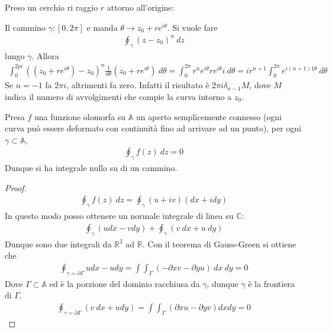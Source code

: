\documentclass[a4paper, oneside]{article}
\begin{document}
\begin{example}
    Preso un cerchio ri raggio $r$ attorno all'origine:

    Il cammino $\gamma : [0, 2\pi]$ e manda $\theta \to z_0 + re^{i\theta}$. Si vuole fare
    \begin{gather*}
        \oint_{\gamma} (z - z_0)^{n} \ dz 
    \end{gather*}
    lungo $\gamma$. Allora 
    \begin{gather*}
        \int_{0}^{2pi} ((z_0 + re^{i\theta}) - z_0)^{n} \frac{1}{d\theta}(z_0 + re^{i\theta})\ d\theta = \int_{0}^{2\pi} r^{n} e^{i\theta} re^{i\theta}i\ d\theta = ir^{n + 1}\int_{0}^{2\pi} e^{i(n + 1)1\theta} \ d\theta    
    \end{gather*}
    Se $n = -1$ fa $2\pi i$, altrimenti fa zero. Infatti il risultato è $2\pi i \delta_{n - 1}M$, dove $M$ indica il numero di 
    avvolgimenti che compie la curva intorno a $z_0$. 
\end{example}


\begin{theorem}
    Presa $f$ una funzione olomorfa su $\mathbb{A}$ un aperto semplicemente
    connesso (ogni curva può essere deformato con continuità fino ad arrivare ad un punto), 
    per ogni $\gamma \subset \mathbb{A}$, 
    \begin{align}
        \oint_{\gamma} f(z) \ dz = 0 
    \end{align}
    Dunque si ha integrale nullo su di un cammino. 
\end{theorem}
\begin{proof}
    \begin{gather*}
        \oint _{\gamma} f(z ) \ dz = \oint _\gamma (u + iv)(dx + i dy)
    \end{gather*}
    In questo modo posso ottenere un normale integrale di linea su $\mathbb{C}$:
    \begin{gather*}
        \oint_{\gamma}^{} (u dx - v dy)  + \oint_\gamma  (v\ dx + u\ dy)
    \end{gather*}
    Dunque sono due integrali da $\mathbb{R}^{2}$ ad $\mathbb{R}$. Con il teorema di Gauss-Green
    si ottiene che 
    \begin{gather*}
        \oint_{\gamma = \partial \Gamma} u dx - u dy = \int\int_{\Gamma} (-\partial x v - \partial y u) \ dx \ dy  = 0
    \end{gather*}
    Dove $\Gamma \subset \mathbb{A}$ ed è la porzione del dominio racchiusa da $\gamma$, dunque
    $\gamma$ è la frontiera di $\Gamma$. 
    \begin{gather*}
        \oint _{\gamma = \partial \Gamma} (v \ dx + u dy ) = \int \int_\Gamma (\partial x u - \partial y v) dx dy = 0 
    \end{gather*}
\end{proof}
\end{document}
